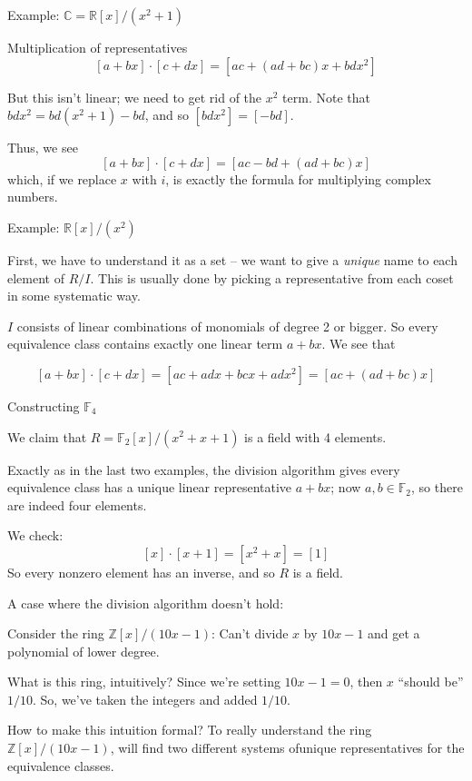 \documentclass{beamer}
\newcommand{\Z}{\mathbb{Z}}
\newcommand{\R}{\mathbb{R}}
\begin{document}
\begin{frame}{Example: $\mathbb{C}=\R[x]/(x^2+1)$}

\begin{block}{Multiplication of representatives}
$$[a+bx]\cdot [c+dx]=[ac+(ad+bc)x+bdx^2]$$

But this isn't linear;  we need to get rid of the $x^2$ term.  Note that $bdx^2=bd(x^2+1)-bd$, and so $[bdx^2]=[-bd]$.

Thus, we see
$$[a+bx]\cdot [c+dx]=[ac-bd+(ad+bc)x]$$
which, if we replace $x$ with $i$, is exactly the formula for multiplying complex numbers.
\end{block}


\end{frame}


\begin{frame}{Example: $\R[x]/(x^2)$}

First, we have to understand it as a set -- we want to give a \emph{unique} name to each element of $R/I$.  This is usually done by picking a representative from each coset in some systematic way.

$I$ consists of linear combinations of monomials of degree 2 or bigger.  So every equivalence class contains exactly one linear term $a+bx$.  We see that 

$$[a+bx]\cdot [c+dx]=[ac+adx+bcx+adx^2]=[ac+(ad+bc)x]$$


\end{frame}




\begin{frame}{Constructing $\mathbb{F}_4$}

We claim that $R=\mathbb{F}_2[x]/(x^2+x+1)$ is a field with 4 elements.  

Exactly as in the last two examples, the division algorithm gives every equivalence class has a unique linear representative $a+bx$; now $a,b\in\mathbb{F}_2$, so there are indeed four elements.

We check:
$$[x]\cdot [x+1]=[x^2+x]=[1]$$
So every nonzero element has an inverse, and so $R$ is a field.
\end{frame}

\begin{frame}{A case where the division algorithm doesn't hold:}
\begin{block}{Consider the ring $\Z[x]/(10x-1)$:}
Can't divide $x$ by $10x-1$ and get a polynomial of lower degree.  
\end{block}

\begin{block}{What is this ring, intuitively?}
  Since we're setting $10x-1=0$, then $x$ ``should be'' $1/10$.  So, we've taken the integers and added $1/10$.
  \end{block}

\begin{block}{How to make this intuition formal?}
To really understand the ring $\Z[x]/(10x-1)$, will find two different systems ofunique representatives for the equivalence classes.
\end{block}
  
  \end{frame}
\end{document}
